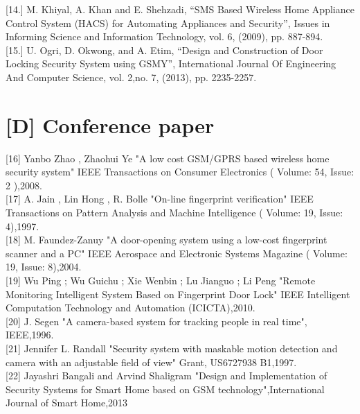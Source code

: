 \documentclass[twoside,a4paper,16pt]{book}
\begin{document}
{{			[14.]	M. Khiyal, A. Khan and E. Shehzadi, “SMS Based Wireless Home Appliance Control System (HACS) for Automating Appliances and Security”, Issues in Informing Science and Information Technology, vol. 6, (2009), pp. 887-894.\\
			
			[15.]	U. Ogri, D. Okwong, and A. Etim, “Design and Construction of Door Locking Security System using GSMY”, International Journal Of Engineering And Computer Science, vol. 2,no. 7, (2013), pp. 2235-2257.\\
			
			
			
			
			\section{[D] Conference paper}
			
			
			[16]	Yanbo Zhao ,  Zhaohui Ye "A low cost GSM/GPRS based wireless home security system" IEEE Transactions on Consumer Electronics ( Volume: 54, Issue: 2 ),2008.\\
			
			{[17]}	A. Jain , Lin Hong , R. Bolle "On-line fingerprint verification" IEEE Transactions on Pattern Analysis and Machine Intelligence ( Volume: 19, Issue: 4),1997.\\
			
			{[18]}	M. Faundez-Zanuy "A door-opening system using a low-cost fingerprint scanner and a PC" IEEE Aerospace and Electronic Systems Magazine ( Volume: 19, Issue: 8),2004.\\
			
			{[19]}	Wu Ping ;  Wu Guichu ;  Xie Wenbin ;  Lu Jianguo ;  Li Peng "Remote Monitoring Intelligent System Based on Fingerprint Door Lock" IEEE Intelligent Computation Technology and Automation (ICICTA),2010.\\
			
			{[20]}	J. Segen "A camera-based system for tracking people in real time", IEEE,1996.\\
			
			{[21]}	Jennifer L. Randall "Security system with maskable motion detection and camera with an adjustable field of view" Grant, US6727938 B1,1997.\\
			
			{[22]}	Jayashri Bangali and Arvind Shaligram "Design and Implementation of Security Systems for Smart Home based on GSM technology",International Journal of Smart Home,2013\\
}}
\end{document}
